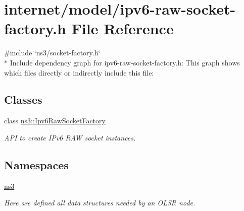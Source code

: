 \hypertarget{ipv6-raw-socket-factory_8h}{}\section{internet/model/ipv6-\/raw-\/socket-\/factory.h File Reference}
\label{ipv6-raw-socket-factory_8h}
{\ttfamily \#include \char`\"{}ns3/socket-\/factory.\+h\char`\"{}}\\*
Include dependency graph for ipv6-\/raw-\/socket-\/factory.h\+:
This graph shows which files directly or indirectly include this file\+:
\subsection*{Classes}
\begin{DoxyCompactItemize}
\item 
class \hyperlink{classns3_1_1Ipv6RawSocketFactory}{ns3\+::\+Ipv6\+Raw\+Socket\+Factory}
\begin{DoxyCompactList}\small\item\em A\+PI to create I\+Pv6 R\+AW socket instances. \end{DoxyCompactList}\end{DoxyCompactItemize}
\subsection*{Namespaces}
\begin{DoxyCompactItemize}
\item 
 \hyperlink{namespacens3}{ns3}
\begin{DoxyCompactList}\small\item\em Here are defined all data structures needed by an O\+L\+SR node. \end{DoxyCompactList}\end{DoxyCompactItemize}
